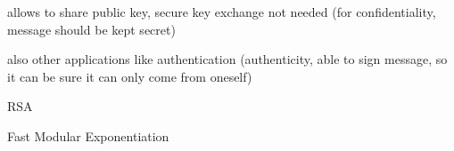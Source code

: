 \documentclass[landscape, a4paper]{article}
\begin{document}
\begin{minipage}[t]{0.198\pagewidth}
\begin{betterlist}
\begin{betterlist}
			\begin{betterlist}
				\item allows to share public key, secure key exchange not needed (for \alert{confidentiality}, message should be kept secret)
				\item also other applications like authentication (\alert{authenticity}, able to sign message, so it can be sure it can only come from oneself)
			\end{betterlist}
		\end{betterlist}
		\begin{betterlist}
			\item RSA
			\begin{betterlist}
				\item Fast Modular Exponentiation
			\end{betterlist}
		\end{betterlist}
	\end{betterlist}
\end{minipage}
\end{document}
